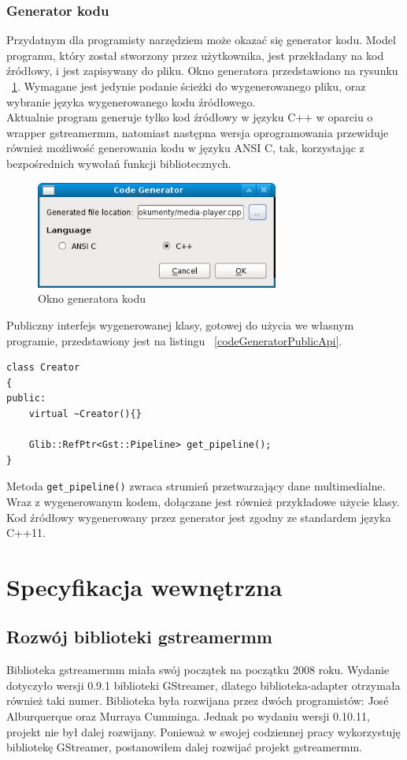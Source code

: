 \documentclass[12pt]{article}
\begin{document}
\subsubsection{Generator kodu}
Przydatnym dla programisty narzędziem może okazać się generator kodu. Model programu, który został stworzony przez użytkownika, jest przekładany na kod źródłowy, i jest zapisywany do pliku. Okno generatora przedstawiono na rysunku ~\ref{fig:codeGenerator}. Wymagane jest jedynie podanie ścieżki do wygenerowanego pliku, oraz wybranie języka wygenerowanego kodu źródłowego.\\
Aktualnie program generuje tylko kod źródłowy w języku C++ w oparciu o wrapper gstreamermm, natomiast następna wersja oprogramowania przewiduje również możliwość generowania kodu w języku ANSI C, tak, korzystając z bezpośrednich wywołań funkcji bibliotecznych.\\
\begin{figure}[H]
  \includegraphics[width=80mm]{img/code-generator.png}
  \caption{Okno generatora kodu}
  \label{fig:codeGenerator}
\end{figure}
Publiczny interfejs wygenerowanej klasy, gotowej do użycia we własnym programie, przedstawiony jest na listingu ~\ref{codeGeneratorPublicApi}.
\begin{lstlisting}[caption=Publiczny interfejs klasy stworzonej przez generator kodu, label=codeGeneratorPublicApi]
class Creator
{
public:
	virtual ~Creator(){}

	Glib::RefPtr<Gst::Pipeline> get_pipeline();
}
\end{lstlisting}
Metoda \texttt{get\_pipeline()} zwraca strumień przetwarzający dane multimedialne.\\
Wraz z wygenerowanym kodem, dołączane jest również przykładowe użycie klasy.\\
Kod źródłowy wygenerowany przez generator jest zgodny ze standardem języka C++11.
\cleardoublepage
\section{Specyfikacja wewnętrzna}
\subsection{Rozwój biblioteki gstreamermm}
Biblioteka gstreamermm miała swój początek na początku 2008 roku. Wydanie dotyczyło wersji 0.9.1 biblioteki GStreamer, dlatego biblioteka-adapter otrzymała również taki numer. Biblioteka była rozwijana przez dwóch programistów: José Alburquerque oraz Murraya Cumminga. Jednak po wydaniu wersji 0.10.11, projekt nie był dalej rozwijany. Ponieważ w swojej codziennej pracy wykorzystuję bibliotekę GStreamer, postanowiłem dalej rozwijać projekt gstreamermm.
\end{document}
